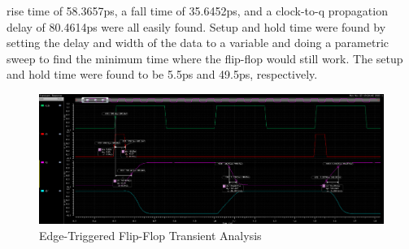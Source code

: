 \documentclass[12pt]{article}
\begin{document}
rise time of 58.3657ps, a fall time of 35.6452ps, and a clock-to-q propagation delay of 80.4614ps were all
easily found. Setup and hold time were found by setting the delay and width of the data to a variable
and doing a parametric sweep to find the minimum time where the flip-flop would still work.
The setup and hold time were found to be 5.5ps and 49.5ps, respectively.
\begin{figure}[!htb]
  \centering
  \includegraphics[width=5in]{figures/transient.png}
  \caption{Edge-Triggered Flip-Flop Transient Analysis}\label{fig:transient}
\end{figure}
\end{document}
